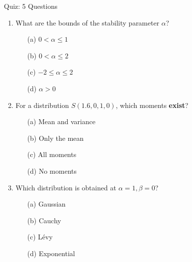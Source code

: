 \documentclass[9pt, aspectratio=169, t]{beamer}
\theoremstyle{definition}
\begin{document}
\begin{frame}{Quiz: 5 Questions}
\begin{enumerate}
    \item What are the bounds of the stability parameter $\alpha$?
    \begin{enumerate}
        \item[(a)] $0 < \alpha \leq 1$
        \item[(b)] $0 < \alpha \leq 2$
        \item[(c)] $-2 \leq \alpha \leq 2$
        \item[(d)] $\alpha > 0$
    \end{enumerate}

    \vspace{0.2cm}
    \item For a distribution $S(1.6, 0, 1, 0)$, which moments \textbf{exist}?
    \begin{enumerate}
        \item[(a)] Mean and variance
        \item[(b)] Only the mean
        \item[(c)] All moments
        \item[(d)] No moments
    \end{enumerate}

    \vspace{0.2cm}
    \item Which distribution is obtained at $\alpha = 1, \beta = 0$?
    \begin{enumerate}
        \item[(a)] Gaussian
        \item[(b)] Cauchy
        \item[(c)] L\'{e}vy
        \item[(d)] Exponential
    \end{enumerate}
\end{enumerate}
\end{frame}
\end{document}
